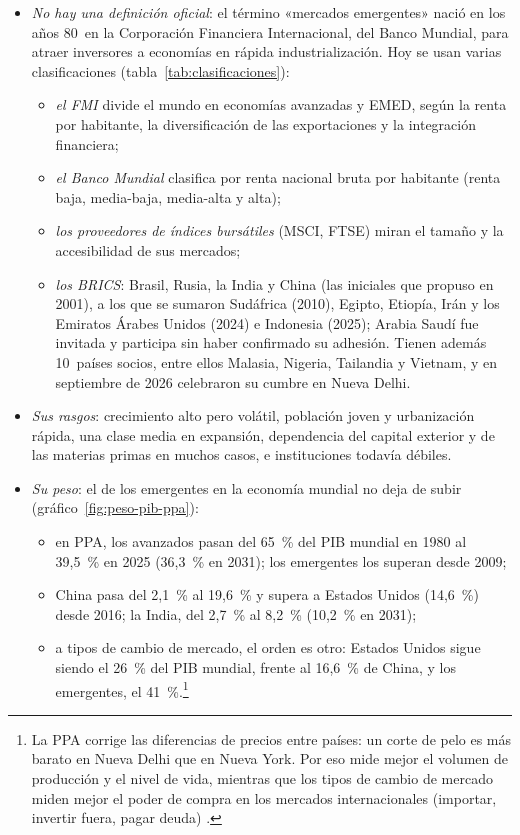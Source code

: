 \documentclass[11pt]{article}
\begin{document}
\begin{itemize}
\item \emph{No hay una definición oficial}: el término «mercados emergentes» nació en los años 80~en la Corporación Financiera Internacional, del Banco Mundial, para atraer inversores a economías en rápida industrialización\nocite{Alonso2019Lecciones}. Hoy se usan varias clasificaciones (tabla~\ref{tab:clasificaciones}):
  \begin{itemize}
  \item \emph{el FMI} divide el mundo en economías avanzadas y EMED, según la renta por habitante, la diversificación de las exportaciones y la integración financiera;
  \item \emph{el Banco Mundial} clasifica por renta nacional bruta por habitante (renta baja, media-baja, media-alta y alta)\nocite{BM2026ClasificacionRenta};
  \item \emph{los proveedores de índices bursátiles} (MSCI, FTSE) miran el tamaño y la accesibilidad de sus mercados;
  \item \emph{los BRICS}: Brasil, Rusia, la India y China (las iniciales que propuso  en 2001)\nocite{ONeill2001Building}, a los que se sumaron Sudáfrica (2010), Egipto, Etiopía, Irán y los Emiratos Árabes Unidos (2024) e Indonesia (2025); Arabia Saudí fue invitada y participa sin haber confirmado su adhesión. Tienen además 10~países socios, entre ellos Malasia, Nigeria, Tailandia y Vietnam, y en septiembre de 2026 celebraron su cumbre en Nueva Delhi\nocite{BRICS2026Delhi}.
  \end{itemize}
\item \emph{Sus rasgos}: crecimiento alto pero volátil, población joven y urbanización rápida, una clase media en expansión, dependencia del capital exterior y de las materias primas en muchos casos, e instituciones todavía débiles.
\item \emph{Su peso}: el de los emergentes en la economía mundial no deja de subir (gráfico~\ref{fig:peso-pib-ppa}):
  \begin{itemize}
  \item en PPA, los avanzados pasan del 65~\% del PIB mundial en 1980 al 39,5~\% en 2025 (36,3~\% en 2031); los emergentes los superan desde 2009\nocite{FMI2026DataMapper};
  \item China pasa del 2,1~\% al 19,6~\% y supera a Estados Unidos (14,6~\%) desde 2016; la India, del 2,7~\% al 8,2~\% (10,2~\% en 2031)\nocite{FMI2026DataMapper};
  \item a tipos de cambio de mercado, el orden es otro: Estados Unidos sigue siendo el 26~\% del PIB mundial, frente al 16,6~\% de China, y los emergentes, el 41~\%\nocite{FMI2026DataMapper}.\footnote{La PPA corrige las diferencias de precios entre países: un corte de pelo es más barato en Nueva Delhi que en Nueva York. Por eso mide mejor el volumen de producción y el nivel de vida, mientras que los tipos de cambio de mercado miden mejor el poder de compra en los mercados internacionales (importar, invertir fuera, pagar deuda) .}
  \end{itemize}
\end{itemize}
\end{document}
